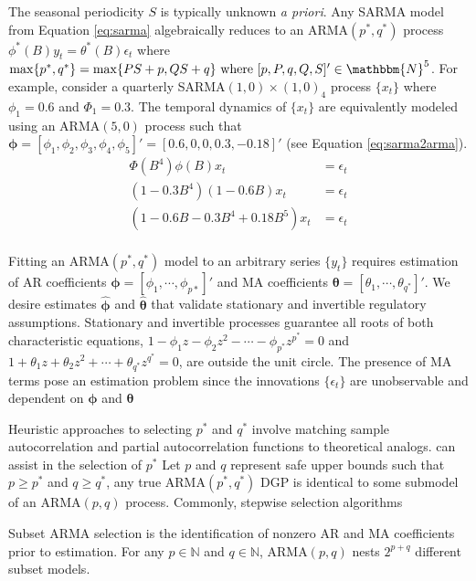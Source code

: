 The seasonal periodicity $S$ is typically unknown \textit{a priori}. Any SARMA model from Equation \ref{eq:sarma} algebraically reduces to an ARMA$(p^*,q^*)$ process $\phi^*(B)y_t=\theta^*(B)\epsilon_t$ where $\max\{p^*,q^*\}=\max\{PS+p,QS+q\} \textrm{ where } [p,P,q,Q,S]'\in\mathbbm{N}^5$. For example, consider a quarterly SARMA$(1,0)\times(1,0)_{4}$ process $\{x_t\}$ where $\phi_1=0.6$ and $\Phi_1=0.3$. The temporal dynamics of $\{x_t\}$ are equivalently modeled using an ARMA$(5,0)$ process such that $\bm{\phi}=[\phi_1,\phi_2,\phi_3,\phi_4,\phi_5]'=[0.6,0,0,0.3,-0.18]'$ (see Equation \ref{eq:sarma2arma}).
\begin{equation}
\label{eq:sarma2arma}
\begin{split}
\Phi(B^4)\phi(B)x_t&=\epsilon_t\\
(1-0.3B^4)(1-0.6B)x_t&=\epsilon_t\\
(1-0.6B-0.3B^4+0.18B^5)x_t&=\epsilon_t\\
\end{split}
\end{equation}

Fitting an ARMA$(p^*,q^*)$ model to an arbitrary series $\{y_t\}$ requires estimation of AR coefficients $\bm{\phi}=[\phi_1,\cdots,\phi_{p*}]'$ and MA coefficients $\bm{\theta}=[\theta_1,\cdots,\theta_{q^*}]'$. We desire estimates $\hat{\bm{\phi} }$ and $\hat{\bm{\theta} }$ that validate stationary and invertible regulatory assumptions. Stationary and invertible processes guarantee all roots of both characteristic equations, $1-\phi_1z-\phi_2z^2-\cdots -\phi_{p^*}z^{p^*}=0$ and $1+\theta_1z+\theta_2z^2+\cdots +\theta_{q^*}z^{q^*}=0$, are outside the unit circle.  The presence of MA terms pose an estimation problem since the innovations $\{\epsilon_t\}$ are unobservable and dependent on $\bm{\phi}$ and $\bm{\theta}$

Heuristic approaches to selecting $p^*$ and $q^*$ involve matching sample autocorrelation and partial autocorrelation functions to theoretical analogs. can assist in the selection of $p^*$ Let $p$ and $q$ represent safe upper bounds such that $p\geq p^*$ and $q\geq q^*$, any true ARMA$(p^*,q^*)$ DGP is identical to some submodel of an ARMA$(p,q)$ process.
 Commonly, stepwise selection algorithms

Subset ARMA selection is the identification of nonzero AR and MA coefficients prior to estimation. For any $p\in\mathbb{N}$ and $q\in\mathbb{N}$, ARMA$(p,q)$ nests $2^{p+q}$ different subset models.
 

\bigskip\bigskip\bigskip







